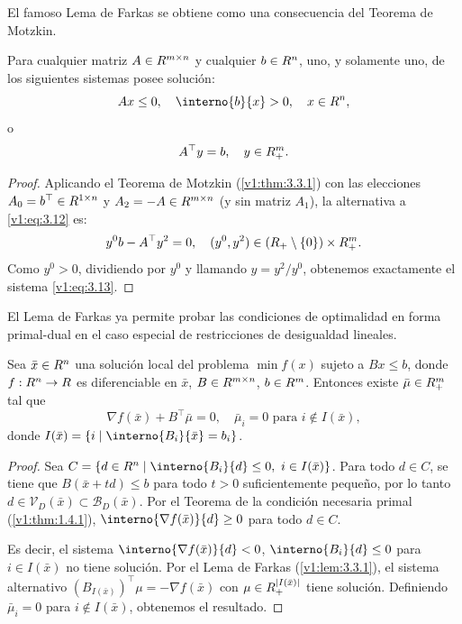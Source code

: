 El famoso Lema de Farkas se obtiene como una consecuencia del Teorema de Motzkin.

\begin{lemma}\label{v1:lem:3.3.1}
 Para cualquier matriz $A \in R^{m \times n}$ y cualquier $b \in R^n$, uno, y solamente uno, de los siguientes sistemas posee solución:
 \begin{equation}
 A x \le 0, \quad \interno{b}{x} > 0, \quad x \in \Rn, \label{v1:eq:3.12}
 \end{equation}
 o
 \begin{equation}
 A^\top y = b, \quad y \in R^m_+. \label{v1:eq:3.13}
 \end{equation}
\end{lemma}

\begin{proof}
 Aplicando el Teorema de Motzkin (\cref{v1:thm:3.3.1}) con las elecciones $A_0 = b^\top \in R^{1 \times n}$ y $A_2 = -A \in R^{m \times n}$ (y sin matriz $A_1$), la alternativa a \eqref{v1:eq:3.12} es:
 \[
 y^0 b - A^\top y^2 = 0, \quad (y^0, y^2) \in (R_+ \setminus \{0\}) \times R^m_+.
 \]
 Como $y^0 > 0$, dividiendo por $y^0$ y llamando $y = y^2 / y^0$, obtenemos exactamente el sistema \eqref{v1:eq:3.13}.
\end{proof}

El Lema de Farkas ya permite probar las condiciones de optimalidad en forma primal-dual en el caso especial de restricciones de desigualdad lineales. 

\begin{corollary}\label{v1:cor:3.3.1}
 Sea $\bar{x} \in R^n$ una solución local del problema $\min f(x)$ sujeto a $Bx \le b$, donde $f : R^n \to R$ es diferenciable en $\bar{x}$, $B \in R^{m \times n}$, $b \in R^m$. Entonces existe $\bar{\mu} \in R^m_+$ tal que
 \[
 \nabla f(\bar{x}) + B^\top \bar{\mu} = 0, \quad \bar{\mu}_i = 0 \text{ para } i \notin I(\bar{x}),
 \]
 donde $I(\bar{x}) = \{i \mid \interno{B_i}{\bar{x}} = b_i\}$.
\end{corollary}

\begin{proof}
 Sea $C = \{ d \in \Rn \mid \interno{B_i}{d} \le 0, \ i \in I(\bar{x}) \}$. Para todo $d \in C$, se tiene que $B(\bar{x} + td) \le b$ para todo $t > 0$ suficientemente pequeño, por lo tanto $d \in \mathcal{V}_D(\bar{x}) \subset \mathcal{B}_D(\bar{x})$. Por el Teorema de la condición necesaria primal (\cref{v1:thm:1.4.1}), $\interno{\nabla f(\bar{x})}{d} \ge 0$ para todo $d \in C$. 
 
 Es decir, el sistema $\interno{\nabla f(\bar{x})}{d} < 0$, $\interno{B_i}{d} \le 0$ para $i \in I(\bar{x})$ no tiene solución. Por el Lema de Farkas (\cref{v1:lem:3.3.1}), el sistema alternativo $(B_{I(\bar{x})})^\top \mu = -\nabla f(\bar{x})$ con $\mu \in R^{|I(\bar{x})|}_+$ tiene solución. Definiendo $\bar{\mu}_i = 0$ para $i \notin I(\bar{x})$, obtenemos el resultado.
\end{proof}

